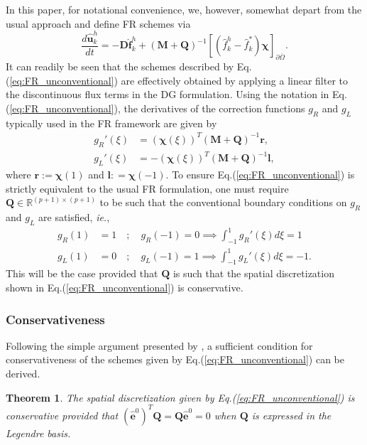 \documentclass[preprint,12pt]{elsarticle}
\newtheorem{theorem}{Theorem}
\begin{document}
In this paper, for notational convenience, we, however, somewhat depart from the usual approach and define FR schemes via
\begin{equation}
    \frac{d\hat{\mathbf{u}}_k^h}{dt}
    = -\mathbf{D} \hat{\mathbf{f}}_k^h
    + (\mathbf{M} + \mathbf{Q})^{-1}\left[(\hat{f}_k^h - \hat{f}_k^{*})\bm{\chi}\right]_{\partial \bar{\Omega}}.
    \label{eq:FR_unconventional}
\end{equation}
It can readily be seen that the schemes described by Eq.(\ref{eq:FR_unconventional}) are effectively obtained by applying a linear filter to the discontinuous flux terms in the DG formulation. Using the notation in Eq.(\ref{eq:FR_unconventional}), the derivatives of the correction functions $g_R$ and $g_L$ typically used in the FR framework are given by
\begin{align}
    g_R'(\xi) &= (\bm{\chi}(\xi))^T(\mathbf{M} + \mathbf{Q})^{-1} \mathbf{r}, \\
    g_L'(\xi) &= -(\bm{\chi}(\xi))^T(\mathbf{M} + \mathbf{Q})^{-1} \mathbf{l},
\end{align}
where $\mathbf{r} := \bm{\chi}(1)$ and $\mathbf{l} : = \bm{\chi}(-1)$. To ensure Eq.(\ref{eq:FR_unconventional}) is strictly equivalent to the usual FR formulation, one must require $\mathbf{Q} \in \mathbb{R}^{(p+1)\times(p+1)}$ to be such that the conventional boundary conditions on $g_R$ and $g_L$ are satisfied, \textit{ie.},
\begin{align}
    g_R(1) &= 1 \quad ; \quad g_R(-1) = 0 \implies \int_{-1}^{1} g_R'(\xi) d\xi = 1 \\
    g_L(1) &= 0 \quad ; \quad g_L(-1) = 1 \implies \int_{-1}^{1} g_L'(\xi) d\xi = -1.
\end{align}
This will be the case provided that $\mathbf{Q}$ is such that the spatial discretization shown in Eq.(\ref{eq:FR_unconventional}) is conservative.

\subsubsection{Conservativeness}
Following the simple argument presented by \cite{vincent2015extended}, a sufficient condition for conservativeness of the schemes given by Eq.(\ref{eq:FR_unconventional}) can be derived.
\begin{theorem}
\label{theo:FR_conservative}
The spatial discretization given by Eq.(\ref{eq:FR_unconventional}) is conservative provided that $(\hat{\mathbf{e}}^0)^T\mathbf{Q} = \mathbf{Q}\hat{\mathbf{e}}^0 =0$ when $\mathbf{Q}$ is expressed in the Legendre basis.
\end{theorem}
\end{document}
